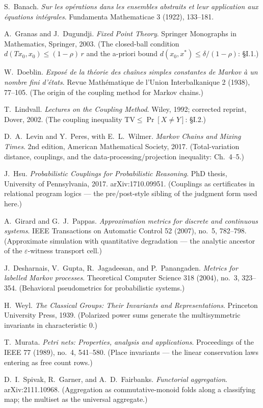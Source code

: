 
S.~Banach.
\emph{Sur les op\'erations dans les ensembles abstraits et leur
application aux \'equations int\'egrales}.
Fundamenta Mathematicae 3 (1922), 133--181.

A.~Granas and J.~Dugundji.
\emph{Fixed Point Theory}.
Springer Monographs in Mathematics, Springer, 2003. (The closed-ball
condition $d(Tx_0, x_0) \leq (1 - \rho)\,r$ and the a-priori bound
$d(x_0, x^*) \leq \delta/(1-\rho)$: \S I.1.)

W.~Doeblin.
\emph{Expos\'e de la th\'eorie des cha\^ines simples constantes de
Markov \`a un nombre fini d'\'etats}.
Revue Math\'ematique de l'Union Interbalkanique 2 (1938), 77--105.
(The origin of the coupling method for Markov chains.)

T.~Lindvall.
\emph{Lectures on the Coupling Method}.
Wiley, 1992; corrected reprint, Dover, 2002. (The coupling inequality
$\mathrm{TV} \leq \Pr[X \neq Y]$: \S I.2.)

D.~A.~Levin and Y.~Peres, with E.~L.~Wilmer.
\emph{Markov Chains and Mixing Times}.
2nd edition, American Mathematical Society, 2017. (Total-variation
distance, couplings, and the data-processing/projection inequality:
Ch.~4--5.)

J.~Hsu.
\emph{Probabilistic Couplings for Probabilistic Reasoning}.
PhD thesis, University of Pennsylvania, 2017. arXiv:1710.09951.
(Couplings as certificates in relational program logics --- the
pre/post-style sibling of the judgment form used here.)

A.~Girard and G.~J.~Pappas.
\emph{Approximation metrics for discrete and continuous systems}.
IEEE Transactions on Automatic Control 52 (2007), no.~5, 782--798.
(Approximate simulation with quantitative degradation --- the analytic
ancestor of the $\varepsilon$-witness transport cell.)

J.~Desharnais, V.~Gupta, R.~Jagadeesan, and P.~Panangaden.
\emph{Metrics for labelled Markov processes}.
Theoretical Computer Science 318 (2004), no.~3, 323--354.
(Behavioral pseudometrics for probabilistic systems.)

H.~Weyl.
\emph{The Classical Groups: Their Invariants and Representations}.
Princeton University Press, 1939. (Polarized power sums generate the
multisymmetric invariants in characteristic 0.)

T.~Murata.
\emph{Petri nets: Properties, analysis and applications}.
Proceedings of the IEEE 77 (1989), no.~4, 541--580. (Place invariants
--- the linear conservation laws entering as free count rows.)

D.~I.~Spivak, R.~Garner, and A.~D.~Fairbanks.
\emph{Functorial aggregation}.
arXiv:2111.10968. (Aggregation as commutative-monoid folds along a
classifying map; the multiset as the universal aggregate.)
